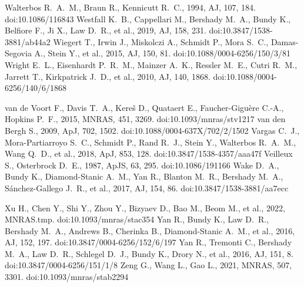 \documentclass[fleqn,usenatbib]{mnras}
\begin{document}
\begin{thebibliography}{}
 Walterbos R.~A.~M., Braun R., Kennicutt R.~C., 1994, AJ, 107, 184. doi:10.1086/116843
 Westfall K.~B., Cappellari M., Bershady M.~A., Bundy K., Belfiore F., Ji X., Law D.~R., et al., 2019, AJ, 158, 231. doi:10.3847/1538-3881/ab44a2
 Wiegert T., Irwin J., Miskolczi A., Schmidt P., Mora S.~C., Damas-Segovia A., Stein Y., et al., 2015, AJ, 150, 81. doi:10.1088/0004-6256/150/3/81
 Wright E.~L., Eisenhardt P.~R.~M., Mainzer A.~K., Ressler M.~E., Cutri R.~M., Jarrett T., Kirkpatrick J.~D., et al., 2010, AJ, 140, 1868. doi:10.1088/0004-6256/140/6/1868


 van de Voort F., Davis T.~A., Kere{\v{s}} D., Quataert E., Faucher-Gigu{\`e}re C.-A., Hopkins P.~F., 2015, MNRAS, 451, 3269. doi:10.1093/mnras/stv1217
 van den Bergh S., 2009, ApJ, 702, 1502. doi:10.1088/0004-637X/702/2/1502
 Vargas C.~J., Mora-Partiarroyo S.~C., Schmidt P., Rand R.~J., Stein Y., Walterbos R.~A.~M., Wang Q.~D., et al., 2018, ApJ, 853, 128. doi:10.3847/1538-4357/aaa47f
 Veilleux S., Osterbrock D.~E., 1987, ApJS, 63, 295. doi:10.1086/191166
 Wake D.~A., Bundy K., Diamond-Stanic A.~M., Yan R., Blanton M.~R., Bershady M.~A., S{\'a}nchez-Gallego J.~R., et al., 2017, AJ, 154, 86. doi:10.3847/1538-3881/aa7ecc

 Xu H., Chen Y., Shi Y., Zhou Y., Bizyaev D., Bao M., Beom M., et al., 2022, MNRAS.tmp. doi:10.1093/mnras/stac354
 Yan R., Bundy K., Law D.~R., Bershady M.~A., Andrews B., Cherinka B., Diamond-Stanic A.~M., et al., 2016, AJ, 152, 197. doi:10.3847/0004-6256/152/6/197
 Yan R., Tremonti C., Bershady M.~A., Law D.~R., Schlegel D.~J., Bundy K., Drory N., et al., 2016, AJ, 151, 8. doi:10.3847/0004-6256/151/1/8
 Zeng G., Wang L., Gao L., 2021, MNRAS, 507, 3301. doi:10.1093/mnras/stab2294

\end{thebibliography}




\bsp	%
\label{lastpage}
\end{document}
